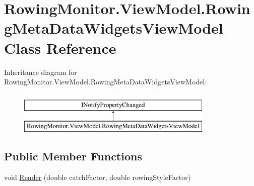 \hypertarget{class_rowing_monitor_1_1_view_model_1_1_rowing_meta_data_widgets_view_model}{}\section{Rowing\+Monitor.\+View\+Model.\+Rowing\+Meta\+Data\+Widgets\+View\+Model Class Reference}
\label{class_rowing_monitor_1_1_view_model_1_1_rowing_meta_data_widgets_view_model}
Inheritance diagram for Rowing\+Monitor.\+View\+Model.\+Rowing\+Meta\+Data\+Widgets\+View\+Model\+:\begin{figure}[H]
\begin{center}
\leavevmode
\includegraphics[height=2.000000cm]{class_rowing_monitor_1_1_view_model_1_1_rowing_meta_data_widgets_view_model}
\end{center}
\end{figure}
\subsection*{Public Member Functions}
\begin{DoxyCompactItemize}
\item 
void \hyperlink{class_rowing_monitor_1_1_view_model_1_1_rowing_meta_data_widgets_view_model_a272d9f725b957aadf11817c893020636}{Render} (double catch\+Factor, double rowing\+Style\+Factor)
\end{DoxyCompactItemize}
